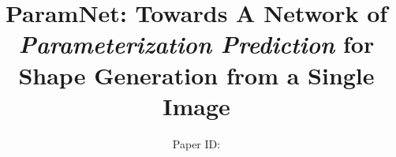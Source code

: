 

\title[ParamNet: Towards A Network of \emph{Parameterization
	Prediction} for Shape Generation from a Single Image]%
      {ParamNet: Towards A Network of \emph{Parameterization
      	Prediction} for Shape Generation from a Single Image}

\author[Paper ID:]
{Paper ID:}

%





\maketitle
 





%



